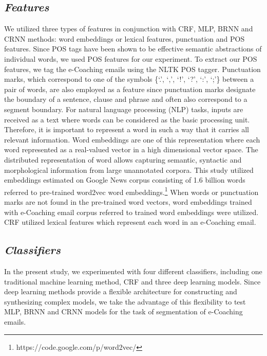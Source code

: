 \documentclass{amia}
\begin{document}
\subsection*{\textit{Features}}

We utilized three types of features in conjunction with CRF, MLP, BRNN and CRNN methods: word embeddings or lexical features, punctuation and POS features. Since POS tags have been shown to be effective semantic abstractions of individual words, we used POS features for our experiment.\cite{liu2005using,treviso2017sentence} To extract our POS features, we tag the e-Coaching emails using the NLTK POS tagger. Punctuation marks, which correspond to one of the symbols \{`.', `,', `!', `?', `:', `;'\} between a pair of words, are also employed as a feature since punctuation marks designate the boundary of a sentence, clause and phrase and often also correspond to a segment boundary.\cite{cho2002text} For natural language processing (NLP) tasks, inputs are received as a text where words can be considered as the basic processing unit. Therefore, it is important to represent a word in such a way that it carries all relevant information. Word embeddings are one of this representation where each word represented as a real-valued vector in a high dimensional vector space. The distributed representation of word allows capturing semantic, syntactic and morphological information from large unannotated corpora.\cite{pennington2014glove, mikolov2013distributed} This study utilized embeddings estimated on Google News corpus consisting of 1.6 billion words referred to pre-trained word2vec word embeddings.\footnote{\label{fn:word2vec}https://code.google.com/p/word2vec/} When words or punctuation marks are not found in the pre-trained word vectors, word embeddings trained with e-Coaching email corpus referred to trained word embeddings were utilized. CRF utilized lexical features which represent each word in an e-Coaching email. 

\subsection*{\textit{Classifiers}}

In the present study, we experimented with four different classifiers, including one traditional machine learning method, CRF and three deep learning models. Since deep learning methods provide a flexible architecture for constructing and synthesizing complex models, we take the advantage of this flexibility to test MLP, BRNN and CRNN models for the task of segmentation of e-Coaching emails.
\end{document}
